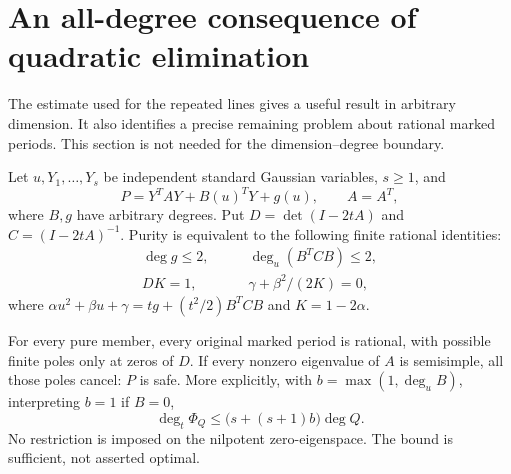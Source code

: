 \section{An all-degree consequence of quadratic elimination}
\label{sec:constantfibres}

The estimate used for the repeated lines gives a useful result
in arbitrary dimension. It also identifies a precise remaining
problem about rational marked periods. This section is not
needed for the dimension--degree boundary.

\begin{theorem}\label{thm:constantfibres}
Let $u,Y_1,\ldots,Y_s$ be independent standard Gaussian variables,
$s\ge1$, and
\[
 P=Y^TAY+B(u)^TY+g(u),\qquad A=A^T,
\]
where $B,g$ have arbitrary degrees. Put $D=\det(I-2tA)$ and
$C=(I-2tA)^{-1}$. Purity is equivalent to the following finite
rational identities:
\begin{align}
 \deg g\le2,\qquad &\deg_u(B^TCB)\le2,\label{eq:fibredegree}\\
 D K=1,\qquad &\gamma+\beta^2/(2K)=0,\label{eq:fibreunit}
\end{align}
where $\alpha u^2+\beta u+\gamma=tg+(t^2/2)B^TCB$ and
$K=1-2\alpha$.

For every pure member, every original marked period is rational,
with possible finite poles only at zeros of $D$. If every
nonzero eigenvalue of $A$ is semisimple, all those poles cancel:
$P$ is safe. More explicitly, with
$b=\max(1,\deg_u B)$, interpreting $b=1$ if $B=0$,
\begin{equation}\label{eq:fibrecutoff}
 \deg_t\Phi_Q\le\bigl(s+(s+1)b\bigr)\deg Q.
\end{equation}
No restriction is imposed on the nilpotent zero-eigenspace.
The bound is sufficient, not asserted optimal.
\end{theorem}

